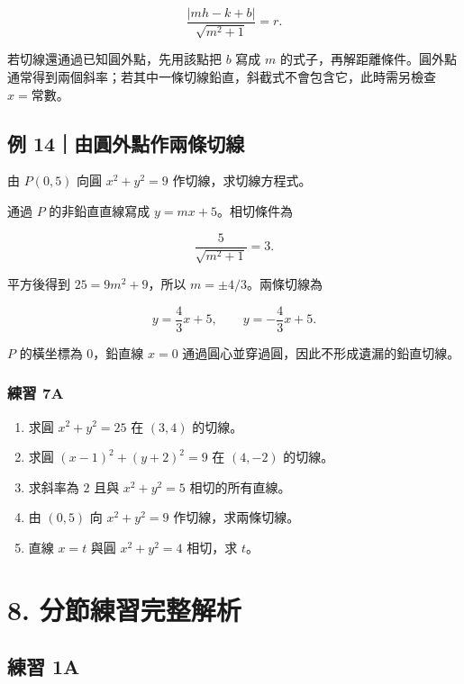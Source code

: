 \documentclass[11pt,a4paper]{article}
\providecommand{\tightlist}{%
  \setlength{\itemsep}{0pt}\setlength{\parskip}{0pt}}
\begin{document}
\[
\boxed{\frac{|mh-k+b|}{\sqrt{m^2+1}}=r}.
\]

若切線還通過已知圓外點，先用該點把 \(b\) 寫成 \(m\) 的式子，再解距離條件。圓外點通常得到兩個斜率；若其中一條切線鉛直，斜截式不會包含它，此時需另檢查 \(x=\text{常數}\)。

\subsection{例 14｜由圓外點作兩條切線}\label{ux4f8b-14ux7531ux5713ux5916ux9edeux4f5cux5169ux689dux5207ux7dda}

由 \(P(0,5)\) 向圓 \(x^2+y^2=9\) 作切線，求切線方程式。

通過 \(P\) 的非鉛直直線寫成 \(y=mx+5\)。相切條件為

\[
\frac5{\sqrt{m^2+1}}=3.
\]

平方後得到 \(25=9m^2+9\)，所以 \(m=\pm4/3\)。兩條切線為

\[
\boxed{y=\frac43x+5},\qquad
\boxed{y=-\frac43x+5}.
\]

\(P\) 的橫坐標為 \(0\)，鉛直線 \(x=0\) 通過圓心並穿過圓，因此不形成遺漏的鉛直切線。

\subsubsection{練習 7A}\label{ux7df4ux7fd2-7a}

\begin{enumerate}
\def\labelenumi{\arabic{enumi}.}
\tightlist
\item
  求圓 \(x^2+y^2=25\) 在 \((3,4)\) 的切線。
\item
  求圓 \((x-1)^2+(y+2)^2=9\) 在 \((4,-2)\) 的切線。
\item
  求斜率為 \(2\) 且與 \(x^2+y^2=5\) 相切的所有直線。
\item
  由 \((0,5)\) 向 \(x^2+y^2=9\) 作切線，求兩條切線。
\item
  直線 \(x=t\) 與圓 \(x^2+y^2=4\) 相切，求 \(t\)。
\end{enumerate}

\section{8. 分節練習完整解析}\label{ux5206ux7bc0ux7df4ux7fd2ux5b8cux6574ux89e3ux6790}

\subsection{練習 1A}\label{ux7df4ux7fd2-1a-1}
\end{document}
